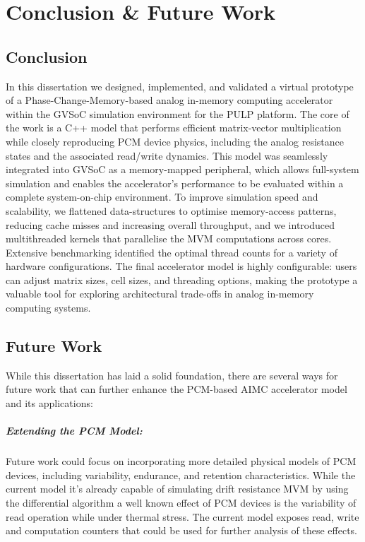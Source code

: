 \chapter{Conclusion \& Future Work}\label{chap:conclusion}
\section{Conclusion}\label{sec:res_sum}
In this dissertation we designed, implemented, and validated a virtual prototype of a Phase-Change-Memory-based analog in-memory computing accelerator within the GVSoC simulation environment for the PULP platform. 
The core of the work is a C++ model that performs efficient matrix-vector multiplication while closely reproducing PCM device physics, including the analog resistance states and the associated read/write dynamics. 
This model was seamlessly integrated into GVSoC as a memory-mapped peripheral, which allows full-system simulation and enables the accelerator's performance to be evaluated within a complete system-on-chip environment. 
To improve simulation speed and scalability, we flattened data-structures to optimise memory-access patterns, reducing cache misses and increasing overall throughput, and we introduced multithreaded kernels that parallelise the MVM computations across cores. 
Extensive benchmarking identified the optimal thread counts for a variety of hardware configurations. 
The final accelerator model is highly configurable: users can adjust matrix sizes, cell sizes, and threading options, making the prototype a valuable tool for exploring architectural trade-offs in analog in-memory computing systems.
\section{Future Work}\label{sec:future_work}
While this dissertation has laid a solid foundation, there are several ways for future work that can further enhance the PCM-based AIMC accelerator model and its applications:\\
\paragraph{Extending the PCM Model:} Future work could focus on incorporating more detailed physical models of PCM devices,
  including variability, endurance, and retention characteristics. While the current model it's already capable of simulating drift resistance MVM by using the differential algorithm a well known effect of PCM devices
  is the variability of read operation while under thermal stress. The current model exposes read, write and computation counters that could be used for further analysis of these effects.\\
